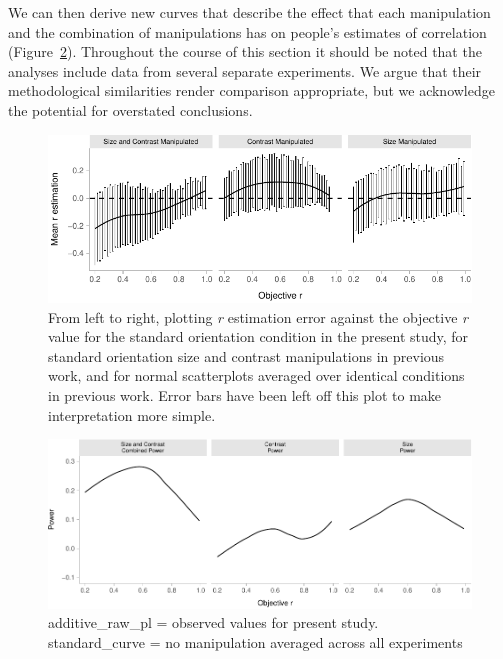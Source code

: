 \documentclass[manuscript, review, anonymous, screen]{acmart}
\begin{document}
We can then derive new curves that describe the effect that each
manipulation and the combination of manipulations has on people's
estimates of correlation (Figure~\ref{fig-power-plot}). Throughout the
course of this section it should be noted that the analyses include data
from several separate experiments. We argue that their methodological
similarities render comparison appropriate, but we acknowledge the
potential for overstated conclusions.

\begin{figure}

{\centering \includegraphics[width=1\textwidth,height=\textheight]{size_and_contrast_new_files/figure-pdf/fig-est-multi-exp-1.pdf}

}

\caption{\label{fig-est-multi-exp}From left to right, plotting \emph{r}
estimation error against the objective \emph{r} value for the standard
orientation condition in the present study, for standard orientation
size and contrast manipulations in previous work, and for normal
scatterplots averaged over identical conditions in previous work. Error
bars have been left off this plot to make interpretation more simple.}

\end{figure}

\begin{figure}

{\centering \includegraphics[width=1\textwidth,height=\textheight]{size_and_contrast_new_files/figure-pdf/fig-power-plot-1.pdf}

}

\caption{\label{fig-power-plot}additive\_raw\_pl = observed values for
present study. standard\_curve = no manipulation averaged across all
experiments}

\end{figure}
\end{document}
